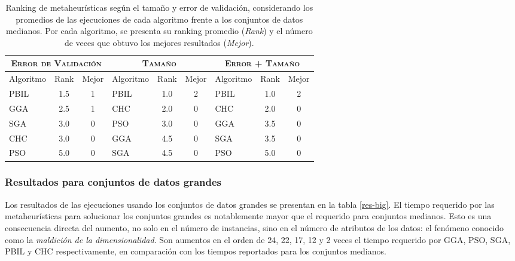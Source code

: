 \begin{table}[h!]
\centering
\begin{tabular}{l c c|l c c|l c c}
\hline
\multicolumn{3}{c|}{\textsc{Error de Validación}}
	& \multicolumn{3}{c|}{\textsc{Tamaño}}
	& \multicolumn{3}{c}{\textsc{Error + Tamaño}} \\
\hline
Algoritmo & Rank & Mejor & Algoritmo & Rank & Mejor & Algoritmo & Rank & Mejor \\
\hline
\hline
PBIL & 1.5 & 1 & PBIL & 1.0 & 2 & PBIL & 1.0 & 2 \\
GGA  & 2.5 & 1 & CHC  & 2.0 & 0 & CHC  & 2.0 & 0 \\
SGA  & 3.0 & 0 & PSO  & 3.0 & 0 & GGA  & 3.5 & 0 \\
CHC  & 3.0 & 0 & GGA  & 4.5 & 0 & SGA  & 3.5 & 0 \\
PSO  & 5.0 & 0 & SGA  & 4.5 & 0 & PSO  & 5.0 & 0 \\
\hline
\end{tabular}
\caption[Ranking de metaheurísticas usando conjuntos de datos medianos]{Ranking de metaheurísticas según el tamaño y error de validación, considerando los promedios de las ejecuciones de cada algoritmo frente a los conjuntos de datos medianos. Por cada algoritmo, se presenta su ranking promedio (\emph{Rank}) y el número de veces que obtuvo los mejores resultados (\emph{Mejor}).}
\label{res-med-rank}
\end{table}

\subsubsection{Resultados para conjuntos de datos grandes}

Los resultados de las ejecuciones usando los conjuntos de datos grandes se presentan en la tabla \ref{res-big}. El tiempo requerido por las metaheurísticas para solucionar los conjuntos grandes es notablemente mayor que el requerido para conjuntos medianos. Esto es una consecuencia directa del aumento, no solo en el número de instancias, sino en el número de atributos de los datos: el fenómeno conocido como la \guillemotleft\emph{maldición de la dimensionalidad}\guillemotright. Son aumentos en el orden de 24, 22, 17, 12 y 2 veces el tiempo requerido por GGA, PSO, SGA, PBIL y CHC respectivamente, en comparación con los tiempos reportados para los conjuntos medianos.

